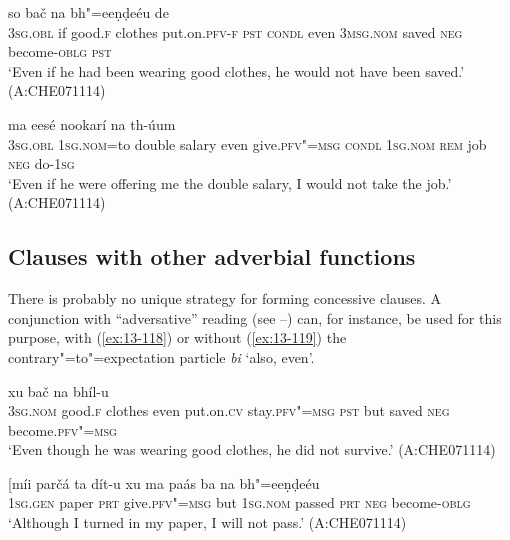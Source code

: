 \begin{exe}
\ex
\label{ex:13-116}
 so bač na bh"=eeṇḍeéu de  \\
\textsc{3sg.obl} if good.\textsc{f} clothes put.on.\textsc{pfv-f} \textsc{pst} \textsc{condl}  even \textsc{3msg.nom} saved \textsc{neg} become-\textsc{oblg} \textsc{pst} \\
\glt `Even if he had been wearing good clothes, he would not have been saved.' (A:CHE071114)

\ex
\label{ex:13-117}
\gll [tíi máa=the ḍábal tanxaá bi dít-u  heentá] ma eesé nookarí na th-úum \\
\textsc{3sg.obl} \textsc{1sg.nom}=to double salary even give.\textsc{pfv"=msg}  \textsc{condl } \textsc{1sg.nom} \textsc{rem} job \textsc{neg} do-\textsc{1sg} \\
\glt `Even if he were offering me the double salary, I would not take the job.' (A:CHE071114)
\end{exe}

\subsection{Clauses with other adverbial functions}
\label{subsec:13-4-5}

 There is probably no unique strategy for forming concessive clauses. A conjunction with ``adversative'' reading (see --) can, for instance, be used for this purpose, with (\ref{ex:13-118}) or without (\ref{ex:13-119}) the contrary"=to"=expectation particle \textit{bi} `also, even'. 

\begin{exe}
\ex
\label{ex:13-118}
 xu bač na bhíl-u  \\
\textsc{3sg.nom} good.\textsc{f} clothes even put.on.\textsc{cv}  stay.\textsc{pfv"=msg } \textsc{pst} but saved \textsc{neg} become.\textsc{pfv"=msg} \\
\glt `Even though he was wearing good clothes, he did not survive.' (A:CHE071114)

\ex
\label{ex:13-119}
\gll [míi parčá ta dít-u xu ma paás  ba na bh"=eeṇḍeéu \\
\textsc{1sg.gen} paper \textsc{prt} give.\textsc{pfv"=msg} but \textsc{1sg.nom} passed \textsc{prt} \textsc{neg} become-\textsc{oblg} \\
\glt `Although I turned in my paper, I will not pass.' (A:CHE071114) 
\end{exe}

